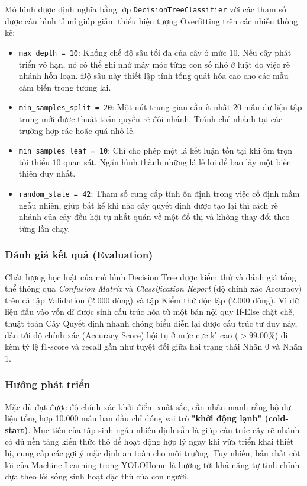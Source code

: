 Mô hình được định nghĩa bằng lớp \texttt{DecisionTreeClassifier} với các tham số được cấu hình tỉ mỉ giúp giảm thiểu hiện tượng Overfitting trên các nhiễu thống kê:
\begin{itemize}
    \item \texttt{max\_depth = 10}: Khống chế độ sâu tối đa của cây ở mức 10. Nếu cây phát triển vô hạn, nó có thể ghi nhớ máy móc từng con số nhỏ ở luật do việc rẽ nhánh hỗn loạn. Độ sâu này thiết lập tính tổng quát hóa cao cho các mẫu cảm biến trong tương lai.
    \item \texttt{min\_samples\_split = 20}: Một nút trung gian cần ít nhất $20$ mẫu dữ liệu tập trung mới được thuật toán quyền rẽ đôi nhánh. Tránh chẻ nhánh tại các trường hợp rác hoặc quá nhỏ lẻ.
    \item \texttt{min\_samples\_leaf = 10}: Chỉ cho phép một lá kết luận tồn tại khi ôm trọn tối thiểu $10$ quan sát. Ngăn hình thành những lá lẻ loi để bao lấy một biến thiên duy nhất.
    \item \texttt{random\_state = 42}: Tham số cung cấp tính ổn định trong việc cố định mầm ngẫu nhiên, giúp bất kể khi nào cây quyết định được tạo lại thì cách rẽ nhánh của cây đều hội tụ nhất quán về một đồ thị và không thay đổi theo từng lần chạy.
\end{itemize}

\subsubsection{Đánh giá kết quả (Evaluation)}
Chất lượng học luật của mô hình Decision Tree được kiểm thử và đánh giá tổng thể thông qua \textit{Confusion Matrix} và \textit{Classification Report} (độ chính xác Accuracy) trên cả tập Validation (2.000 dòng) và tập Kiểm thử độc lập (2.000 dòng). 
Vì dữ liệu đầu vào vốn dĩ được sinh cấu trúc hóa từ một bản nội quy If-Else chặt chẽ, thuật toán Cây Quyết định nhanh chóng biểu diễn lại được cấu trúc tư duy này, dẫn tới độ chính xác (Accuracy Score) hội tụ ở mức cực kì cao ($> 99.00\%$) đi kèm tỷ lệ f1-score và recall gần như tuyệt đối giữa hai trạng thái Nhãn 0 và Nhãn 1. 

\subsubsection{Hướng phát triển}
Mặc dù đạt được độ chính xác khởi điểm xuất sắc, cần nhấn mạnh rằng bộ dữ liệu tổng hợp 10.000 mẫu ban đầu chỉ đóng vai trò \textbf{"khởi động lạnh" (cold-start)}. Mục tiêu của tập sinh ngẫu nhiên định sẵn là giúp cấu trúc cây rẽ nhánh có đủ nền tảng kiến thức thô để hoạt động hợp lý ngay khi vừa triển khai thiết bị, cung cấp các gợi ý mặc định an toàn cho môi trường. Tuy nhiên, bản chất cốt lõi của Machine Learning trong YOLOHome là hướng tới khả năng tự tinh chỉnh dựa theo lối sống sinh hoạt đặc thù của con người.


